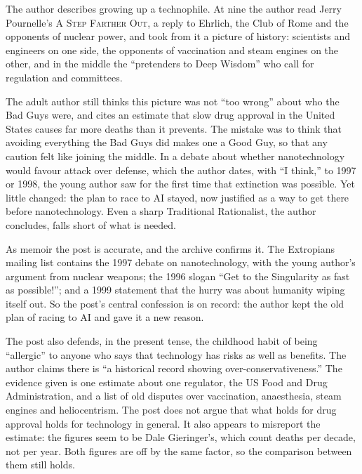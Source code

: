 \begin{afterword}
\summaryhead

The author describes growing up a technophile. At nine the author read Jerry Pournelle's \textsc{A Step Farther Out}, a reply to Ehrlich, the Club of Rome and the opponents of nuclear power, and took from it a picture of history: scientists and engineers on one side, the opponents of vaccination and steam engines on the other, and in the middle the ``pretenders to Deep Wisdom'' who call for regulation and committees.

The adult author still thinks this picture was not ``too wrong'' about who the Bad Guys were, and cites an estimate that slow drug approval in the United States causes far more deaths than it prevents. The mistake was to think that avoiding everything the Bad Guys did makes one a Good Guy, so that any caution felt like joining the middle. In a debate about whether nanotechnology would favour attack over defense, which the author dates, with ``I think,'' to 1997 or 1998, the young author saw for the first time that extinction was possible. Yet little changed: the plan to race to AI stayed, now justified as a way to get there before nanotechnology. Even a sharp Traditional Rationalist, the author concludes, falls short of what is needed.

\responsehead

As memoir the post is accurate, and the archive confirms it. The Extropians mailing list contains the 1997 debate on nanotechnology, with the young author's argument from nuclear weapons; the 1996 slogan ``Get to the Singularity as fast as possible!''; and a 1999 statement that the hurry was about humanity wiping itself out. So the post's central confession is on record: the author kept the old plan of racing to AI and gave it a new reason.

The post also defends, in the present tense, the childhood habit of being ``allergic'' to anyone who says that technology has risks as well as benefits. The author claims there is ``a historical record showing over-conservativeness.'' The evidence given is one estimate about one regulator, the US Food and Drug Administration, and a list of old disputes over vaccination, anaesthesia, steam engines and heliocentrism. The post does not argue that what holds for drug approval holds for technology in general. It also appears to misreport the estimate: the figures seem to be Dale Gieringer's, which count deaths per decade, not per year. Both figures are off by the same factor, so the comparison between them still holds.


\end{afterword}
